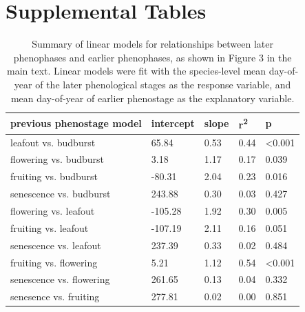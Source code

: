 \documentclass{article}
\begin{document}
\section* {Supplemental Tables}
\begin{table}[ht]
\centering
\caption{Summary of linear models for relationships between later phenophases and earlier phenophases, as shown in Figure 3 in the main text. Linear models were fit with the species-level mean day-of-year of the later phenological stages as the response variable,
and mean day-of-year of earlier phenostage as the explanatory variable.} 
\label{table:prevphase}
\begin{tabular}{|p{}|p{}|p{}|p{}|p{}|}
  \hline
previous phenostage model & intercept & slope & r\textsuperscript{2} & p \\ 
  \hline
leafout vs. budburst & 65.84 & 0.53 & 0.44 & <0.001 \\ 
  flowering vs. budburst & 3.18 & 1.17 & 0.17 & 0.039 \\ 
  fruiting vs. budburst & -80.31 & 2.04 & 0.23 & 0.016 \\ 
  senescence vs. budburst & 243.88 & 0.30 & 0.03 & 0.427 \\ 
  flowering vs. leafout & -105.28 & 1.92 & 0.30 & 0.005 \\ 
  fruiting vs. leafout & -107.19 & 2.11 & 0.16 & 0.051 \\ 
  senescence vs. leafout & 237.39 & 0.33 & 0.02 & 0.484 \\ 
  fruiting vs. flowering & 5.21 & 1.12 & 0.54 & <0.001 \\ 
  senescence vs. flowering & 261.65 & 0.13 & 0.04 & 0.332 \\ 
  senesence vs. fruiting & 277.81 & 0.02 & 0.00 & 0.851 \\ 
   \hline
\end{tabular}
\end{table}%
\end{document}
